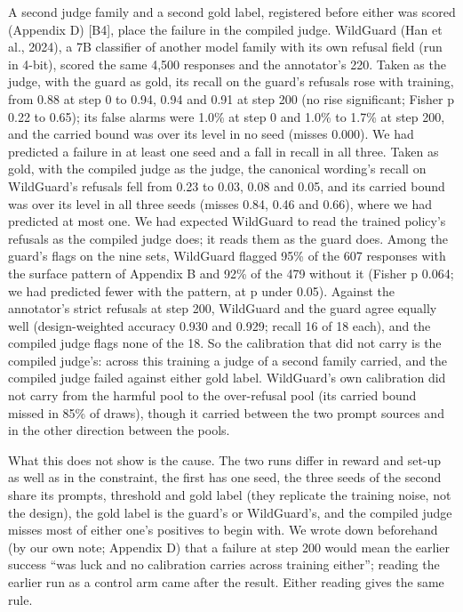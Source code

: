 \documentclass[11pt]{article}
\begin{document}
A second judge family and a second gold label, registered before either was scored (Appendix D) [B4], place the failure in the compiled judge. WildGuard (Han et al., 2024), a 7B classifier of another model family with its own refusal field (run in 4-bit), scored the same 4,500 responses and the annotator's 220. Taken as the judge, with the guard as gold, its recall on the guard's refusals rose with training, from 0.88 at step 0 to 0.94, 0.94 and 0.91 at step 200 (no rise significant; Fisher p 0.22 to 0.65); its false alarms were 1.0\% at step 0 and 1.0\% to 1.7\% at step 200, and the carried bound was over its level in no seed (misses 0.000). We had predicted a failure in at least one seed and a fall in recall in all three. Taken as gold, with the compiled judge as the judge, the canonical wording's recall on WildGuard's refusals fell from 0.23 to 0.03, 0.08 and 0.05, and its carried bound was over its level in all three seeds (misses 0.84, 0.46 and 0.66), where we had predicted at most one. We had expected WildGuard to read the trained policy's refusals as the compiled judge does; it reads them as the guard does. Among the guard's flags on the nine sets, WildGuard flagged 95\% of the 607 responses with the surface pattern of Appendix B and 92\% of the 479 without it (Fisher p 0.064; we had predicted fewer with the pattern, at p under 0.05). Against the annotator's strict refusals at step 200, WildGuard and the guard agree equally well (design-weighted accuracy 0.930 and 0.929; recall 16 of 18 each), and the compiled judge flags none of the 18. So the calibration that did not carry is the compiled judge's: across this training a judge of a second family carried, and the compiled judge failed against either gold label. WildGuard's own calibration did not carry from the harmful pool to the over-refusal pool (its carried bound missed in 85\% of draws), though it carried between the two prompt sources and in the other direction between the pools.


What this does not show is the cause. The two runs differ in reward and set-up as well as in the constraint, the first has one seed, the three seeds of the second share its prompts, threshold and gold label (they replicate the training noise, not the design), the gold label is the guard's or WildGuard's, and the compiled judge misses most of either one's positives to begin with. We wrote down beforehand (by our own note; Appendix D) that a failure at step 200 would mean the earlier success ``was luck and no calibration carries across training either''; reading the earlier run as a control arm came after the result. Either reading gives the same rule.
\end{document}
